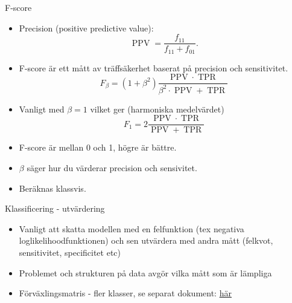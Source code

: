\documentclass[10pt,english]{beamer}
\begin{document}
\begin{frame}{F-score}
    
    \begin{itemize}
        \item  Precision (positive predictive value):
        \begin{equation*}
            \operatorname{PPV} = \frac{f_{11}}{f_{11} + f_{01}}.
        \end{equation*}
        \item F-score är ett mått av träffsäkerhet baserat på precision och sensitivitet.
        \begin{equation*}
            F_{\beta} = (1 + \beta^2) \frac{\operatorname{PPV} \cdot \operatorname{TPR}}{\beta^2 \cdot \operatorname{PPV} + \operatorname{TPR}}
        \end{equation*}
        \item Vanligt med $\beta=1$ vilket ger (harmoniska medelvärdet)
        \begin{equation*}
            F_1 = 2 \frac{\operatorname{PPV} \cdot \operatorname{TPR}}{\operatorname{PPV} + \operatorname{TPR}}
        \end{equation*}
        \item F-score är mellan 0 och 1, högre är bättre.
        \item $\beta$ säger hur du värderar precision och sensivitet.
        \item Beräknas klassvis.
    \end{itemize}

\end{frame}


\begin{frame}{Klassificering - utvärdering}


\begin{itemize}
    \item Vanligt att skatta modellen med en felfunktion (tex negativa loglikelihoodfunktionen) och sen utvärdera med andra mått (felkvot, sensitivitet, specificitet etc)
    \item Problemet och strukturen på data avgör vilka mått som är lämpliga
    \item Förväxlingsmatris - fler klasser, se separat dokument: \href{https://raw.githubusercontent.com/STIMALiU/732G12_DM/master/other/confusion\%20matrix\%20classification\%20evaluation\%20metrics.pdf}{här}
\end{itemize}
    
\end{frame}
\end{document}
